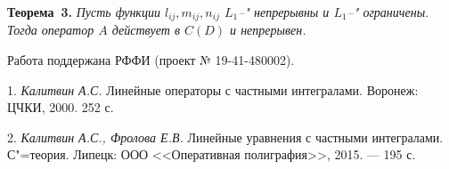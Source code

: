 \textbf{Теорема~3.}
{\it Пусть функции $l_{ij},m_{ij},n_{ij}$ $L_1$--" непрерывны и $L_1$--" ограничены.
Тогда оператор $A$ действует в $C(D)$ и непрерывен.}

Работа поддержана РФФИ (проект № 19-41-480002).


\litlist

1. {\it Калитвин А.С.} Линейные операторы с частными интегралами. Воронеж: ЦЧКИ, 2000. 252 с.

2. {\it Калитвин А.С., Фролова Е.В.} Линейные уравнения с частными интегралами. С"=теория. Липецк: ООО <<Оперативная полиграфия>>, 2015. — 195 с.
